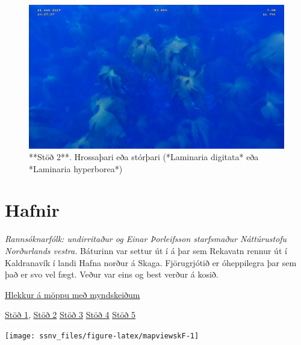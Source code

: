 \documentclass[icelandic,]{book}
\begin{document}
\begin{figure}

{\centering \includegraphics[width=1\linewidth]{skjol/skogar/sk5/stodvar/st2/sk5-st2} 

}

\caption{**Stöð 2**. Hrossaþari eða stórþari (*Laminaria digitata* eða *Laminaria hyperborea*)}\label{fig:mynd-sk-fimm-stod-tvo}
\end{figure}

\hypertarget{hafnir}{%
\chapter*{Hafnir}\label{hafnir}}

\emph{Rannsóknarfólk: undirritaður og Einar Þorleifsson starfsmaður Náttúrustofu Norðurlands vestra.}
Báturinn var settur út í á þar sem Rekavatn rennur út í Kaldranavík í landi Hafna norður á Skaga. Fjörugrjótið er óheppilegra þar sem það er svo vel fægt. Veður var eins og best verður á kosið.

\href{https://www.dropbox.com/sh/4nzz6q9ox6jxbez/AADUS3o9DfCDqZ2d34S2_Mxaa?dl=0}{Hlekkur á möppu með myndskeiðum}

\href{https://www.dropbox.com/s/jrk61lhb4umxqam/Trident-Sep-25-130013-HQ.mp4?dl=0}{Stöð 1},
\href{https://www.dropbox.com/s/m8ft8ny9v6x1tq4/Trident-Sep-25-132106-HQ.mp4?dl=0}{Stöð 2}
\href{https://www.dropbox.com/s/fo2b8nwml3gf5a7/Trident-Sep-25-133854-HQ.mp4?dl=0}{Stöð 3}
\href{https://www.dropbox.com/s/jttuihpf6lfluny/Trident-Sep-25-140023-HQ.mp4?dl=0}{Stöð 4}
\href{https://www.dropbox.com/s/lxkz7ccg38qg3lp/Trident-Sep-25-141235-HQ.mp4?dl=0}{Stöð 5}

\begin{center}\texttt{[image: ssnv\_files/figure-latex/mapviewskF-1]} \end{center}
\end{document}
